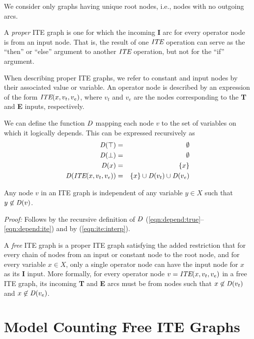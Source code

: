 \documentclass{llncs}
\newcommand{\tautology}{\top}
\newcommand{\nil}{\bot}
\newcommand{\ite}{\mbox{\it ITE}}
\newcommand{\ifarg}{\textbf{I}}
\newcommand{\thenarg}{\textbf{T}}
\newcommand{\elsearg}{\textbf{E}}
\newcommand{\depend}{{\it D}}
\begin{document}
We consider only graphs having unique root nodes, i.e., nodes with no outgoing arcs.

A {\em proper} ITE graph is one for which the incoming \ifarg{} arc for every operator node is
from an input node.  That is, the result of one $\ite$ operation can
serve as the ``then'' or ``else'' argument to another $\ite$
operation, but not for the ``if'' argument.

When describing proper ITE graphs, we refer to constant and input
nodes by their associated value or variable.  An operator node is described by an expression of the form
$\ite(x, v_t, v_e)$, where $v_t$ and $v_e$ are the
nodes corresponding to the \thenarg{} and \elsearg{} inputs, respectively.

We can define the function $\depend$ mapping each node
$v$ to the set of variables on which it logically depends.  This can be expressed recursively as
\begin{eqnarray}
\depend(\tautology) & = & \emptyset \label{eqn:depend:true}\\
\depend(\nil) & = & \emptyset \label{eqn:depend:false}\\
\depend(x) & = & \{x \} \label{eqn:depend:variable}\\
\depend(\ite(x, v_t, v_e)) & = & \{ x \} \cup \depend(v_t) \cup \depend(v_e) \label{eqn:depend:ite}
\end{eqnarray}  


\begin{lemma}
\label{lemma:free}
Any node $v$ in an ITE graph is independent of any variable $y \in X$ such that $y \not \in \depend(v)$.
\end{lemma}  
\noindent
{\em Proof:} Follows by the recursive definition of $\depend$ (\ref{eqn:depend:true}--\ref{eqn:depend:ite}) and by (\ref{eqn:ite:interp}).


A {\em free} ITE graph is a proper ITE graph satisfying the added
restriction that for every chain of nodes from an input or constant
node to the root node, and for every variable $x \in X$, only a single
operator node can have the input node for $x$ as its \ifarg{} input.
More formally, for every operator node $v = \ite(x, v_t, v_e)$ in a
free ITE graph, its incoming \thenarg{} and \elsearg{} arcs must be
from nodes such that $x \not \in \depend(v_t)$ and $x \not \in
\depend(v_e)$.


\section{Model Counting Free ITE Graphs}
\end{document}
